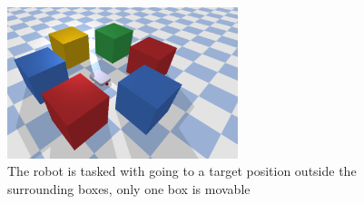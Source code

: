 \begin{figure}[H]
    \centering
    \includegraphics[width=0.6\textwidth]{figures/surrounded/surrounded_by_boxes.png}
    \caption{The robot is tasked with going to a target position outside the surrounding boxes, only one box is movable}
    \label{figure: surrounded_by_boxes}
\end{figure}

